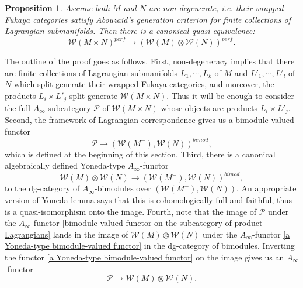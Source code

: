 \documentclass{amsart}
\newtheorem{proposition}[theorem]{Proposition}
\numberwithin{equation}{section}
\numberwithin{figure}{section}
\begin{document}
\begin{proposition} \label{Kunneth formula under non-degeneracy assumption}
	Assume both $M$ and $N$ are non-degenerate, i.e. their wrapped Fukaya categories satisfy Abouzaid's generation criterion for finite collections of Lagrangian submanifolds. Then there is a canonical quasi-equivalence:
\begin{equation} \label{inverse Kunneth functor}
\mathcal{W}(M \times N)^{perf} \to (\mathcal{W}(M) \otimes \mathcal{W}(N))^{perf}.
\end{equation}
\end{proposition}

	The outline of the proof goes as follows. First, non-degeneracy implies that there are finite collections of Lagrangian submanifolds $L_{1}, \cdots, L_{k}$ of $M$ and $L'_{1}, \cdots, L'_{l}$ of $N$ which split-generate their wrapped Fukaya categories, and moreover, the products $L_{i} \times L'_{j}$ split-generate $\mathcal{W}(M \times N)$. Thus it will be enough to consider the full $A_{\infty}$-subcategory $\mathcal{P}$ of $\mathcal{W}(M \times N)$ whose objects are products $L_{i} \times L'_{j}$. 
Second, the framework of Lagrangian correspondence gives us a bimodule-valued functor
\begin{equation}\label{bimodule-valued functor on the subcategory of product Lagrangians}
\mathcal{P} \to (\mathcal{W}(M^{-}), \mathcal{W}(N))^{bimod},
\end{equation}
which is defined at the beginning of this section. 
Third, there is a canonical algebraically defined Yoneda-type $A_{\infty}$-functor
\begin{equation}\label{a Yoneda-type bimodule-valued functor}
\mathcal{W}(M) \otimes \mathcal{W}(N) \to (\mathcal{W}(M^{-}), \mathcal{W}(N))^{bimod},
\end{equation}
to the dg-category of $A_{\infty}$-bimodules over $(\mathcal{W}(M^{-}), \mathcal{W}(N))$. An appropriate version of Yoneda lemma says that this is cohomologically full and faithful, thus is a quasi-isomorphism onto the image. 
Fourth, note that the image of $\mathcal{P}$ under the $A_{\infty}$-functor \eqref{bimodule-valued functor on the subcategory of product Lagrangians} lands in the image of $\mathcal{W}(M) \otimes \mathcal{W}(N)$ under the $A_{\infty}$-functor \eqref{a Yoneda-type bimodule-valued functor} in the dg-category of bimodules. Inverting the functor \eqref{a Yoneda-type bimodule-valued functor} on the image gives us an $A_{\infty}$-functor
\begin{equation}
\mathcal{P} \to \mathcal{W}(M) \otimes \mathcal{W}(N).
\end{equation}
\end{document}
